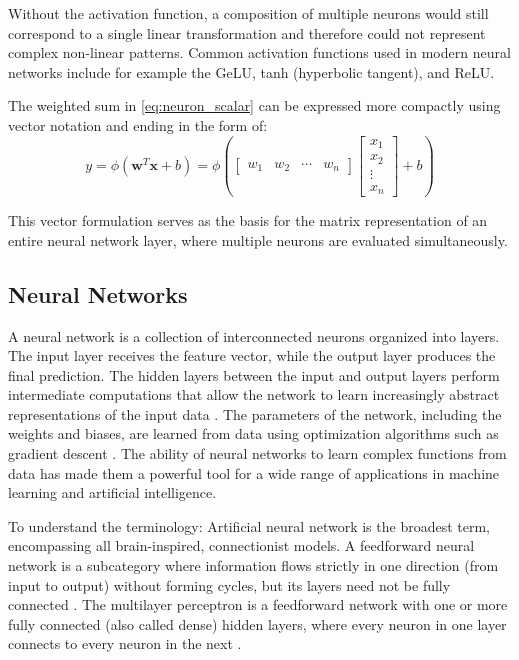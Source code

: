 Without the activation function, a composition of multiple neurons would still correspond to a single linear transformation and therefore could not represent complex non-linear patterns. Common activation functions used in modern neural networks include for example the GeLU, tanh (hyperbolic tangent), and ReLU.




The weighted sum in \autoref{eq:neuron_scalar} can be expressed more compactly using vector notation and ending in the form of:
\begin{equation}
    y = \phi\!\left(\mathbf{w}^T \mathbf{x} + b\right)
	= \phi\!\left(
        \begin{bmatrix}
            w_1 & w_2 & \cdots & w_n
        \end{bmatrix}
        \begin{bmatrix}
            x_1 \\
            x_2 \\
            \vdots \\
            x_n
        \end{bmatrix}
        + b
    \right) 
    \label{eq:single_neuron}
\end{equation}

This vector formulation serves as the basis for the matrix representation of an entire neural network layer, where multiple neurons are evaluated simultaneously.

\subsection{Neural Networks}
A neural network is a collection of interconnected neurons organized into layers. 
The input layer receives the feature vector, while the output layer produces the final prediction. The hidden layers between the input and output layers perform intermediate computations that allow the network to learn increasingly abstract representations of the input data \cite{Goodfellow-et-al-2016}.
The parameters of the network, including the weights and biases, are learned from data using optimization algorithms such as gradient descent \cite{Rumelhart1986LearningRB}. The ability of neural networks to learn complex functions from data has made them a powerful tool for a wide range of applications in machine learning and artificial intelligence.

To understand the terminology: Artificial neural network is the broadest term, encompassing all brain-inspired, connectionist models. A feedforward neural network is a subcategory where information flows strictly in one direction (from input to output) without forming cycles, but its layers need not be fully connected \cite{Goodfellow-et-al-2016}. The multilayer perceptron is a feedforward network with one or more fully connected (also called dense) hidden layers, where every neuron in one layer connects to every neuron in the next \cite{Goodfellow-et-al-2016}.

